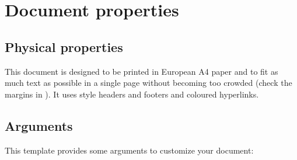 \section{Document properties}

\subsection{Physical properties}

This document is designed to be printed in European A4 paper and to fit as much text as possible in a single page without becoming too crowded (check the margins in ).
It uses  style headers and footers and coloured hyperlinks.

\subsection{Arguments}

This template provides some arguments to customize your document:

